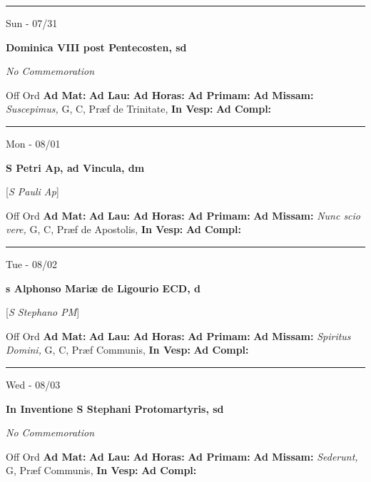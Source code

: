 \documentclass[letterpaper, 10pt]{article}
\begin{document}
\hrule
\begin{center}
Sun - 07/31
\end{center}\textbf{ \large Dominica VIII post Pentecosten, \textnormal{\normalsize sd}}

\textit{No Commemoration}\begin{justify}
Off Ord
\textbf{Ad Mat: }
\textbf{Ad Lau: }
\textbf{Ad Horas: }
\textbf{Ad Primam: }
\textbf{Ad Missam:} \textit{Suscepimus, } G, C, Præf de Trinitate, 
\textbf{In Vesp: }
\textbf{Ad Compl: }\end{justify}



\hrule
\begin{center}
Mon - 08/01
\end{center}\textbf{ \large S Petri Ap, ad Vincula, \textnormal{\normalsize dm}}

[\textit{S Pauli Ap}]
\begin{justify}
Off Ord
\textbf{Ad Mat: }
\textbf{Ad Lau: }
\textbf{Ad Horas: }
\textbf{Ad Primam: }
\textbf{Ad Missam:} \textit{Nunc scio vere, } G, C, Præf de Apostolis, 
\textbf{In Vesp: }
\textbf{Ad Compl: }\end{justify}



\hrule
\begin{center}
Tue - 08/02
\end{center}\textbf{ \large s Alphonso Mariæ de Ligourio ECD, \textnormal{\normalsize d}}

[\textit{S Stephano PM}]
\begin{justify}
Off Ord
\textbf{Ad Mat: }
\textbf{Ad Lau: }
\textbf{Ad Horas: }
\textbf{Ad Primam: }
\textbf{Ad Missam:} \textit{Spiritus Domini, } G, C, Præf Communis, 
\textbf{In Vesp: }
\textbf{Ad Compl: }\end{justify}



\hrule
\begin{center}
Wed - 08/03
\end{center}\textbf{ \large In Inventione S Stephani Protomartyris, \textnormal{\normalsize sd}}

\textit{No Commemoration}\begin{justify}
Off Ord
\textbf{Ad Mat: }
\textbf{Ad Lau: }
\textbf{Ad Horas: }
\textbf{Ad Primam: }
\textbf{Ad Missam:} \textit{Sederunt, } G, Præf Communis, 
\textbf{In Vesp: }
\textbf{Ad Compl: }\end{justify}
\end{document}
